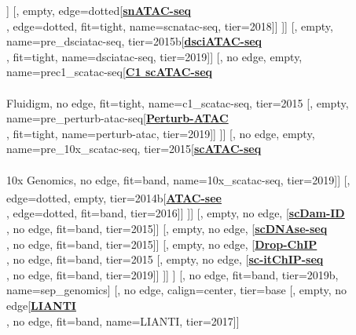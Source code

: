 \documentclass[12pt, a4]{article}
\begin{document}
\begin{center}
\begin{forest}
			[, empty, edge=dotted[\href{https://www.nature.com/articles/nbt.4038}{\textbf{scTHS-seq}}\\\citealt{lake2017b}, edge=dotted, fit=tight, name=scths-seq, tier=2017]]
			[, empty, edge=dotted[\href{https://www.nature.com/articles/s41593-018-0079-3}{\textbf{snATAC-seq}}\\\citealt{preissl2018}, edge=dotted, fit=tight, name=scnatac-seq, tier=2018]]
		]]
		[, empty, name=pre_dsciatac-seq, tier=2015b[\href{https://www.nature.com/articles/s41587-019-0147-6}{\textbf{dsciATAC-seq}}\\\citealt{lareau2019}, fit=tight, name=dsciatac-seq, tier=2019]]
		[, no edge, empty, name=prec1_scatac-seq[\href{https://www.nature.com/articles/nature14590}{\textbf{C1 scATAC-seq}}\\\citealt{buenrostro2015}\\Fluidigm, no edge, fit=tight, name=c1_scatac-seq, tier=2015
			[, empty, name=pre_perturb-atac-seq[\href{https://www.nature.com/articles/nature14590}{\textbf{Perturb-ATAC}}\\\citealt{rubin2019}, fit=tight, name=perturb-atac, tier=2019]]
		]]
		[, no edge, empty, name=pre_10x_scatac-seq, tier=2015[\href{https://www.nature.com/articles/s41587-019-0206-z}{\textbf{scATAC-seq}}\\\citealt{satpathy2019}\\10x Genomics, no edge, fit=band, name=10x_scatac-seq, tier=2019]]
		[, edge=dotted, empty, tier=2014b[\href{https://www.nature.com/articles/nmeth.4031}{\textbf{ATAC-see\textsuperscript{\large{\textmu}}}}\\\citealt{chen2016}, edge=dotted, fit=band, tier=2016]]
	]]
	[, empty, no edge, [\href{https://www.sciencedirect.com/science/article/pii/S0092867415010922}{\textbf{scDam-ID}}\\\citealt{kind2015}, no edge, fit=band, tier=2015]]
	[, empty, no edge, [\href{https://www.nature.com/articles/nature15740}{\textbf{scDNAse-seq}}\\\citealt{jin2015}, no edge, fit=band, tier=2015]]
	[, empty, no edge, [\href{https://www.nature.com/articles/nbt.3383}{\textbf{Drop-ChIP}}\\\citealt{rotem2015}, no edge, fit=band, tier=2015
		[, empty, no edge, [\href{https://www.nature.com/articles/s41556-019-0383-5}{\textbf{sc-itChIP-seq}}\\\citealt{ai2019}, no edge, fit=band, tier=2019]]
	]]
]
[, no edge, fit=band, tier=2019b, name=sep_genomics]
[, no edge, calign=center, tier=base
	[, empty, no edge[\href{https://science.sciencemag.org/content/356/6334/189}{\textbf{LIANTI}}\\\citealt{chen2017}, no edge, fit=band, name=LIANTI, tier=2017]]

\end{forest}
\end{center}
\end{document}
